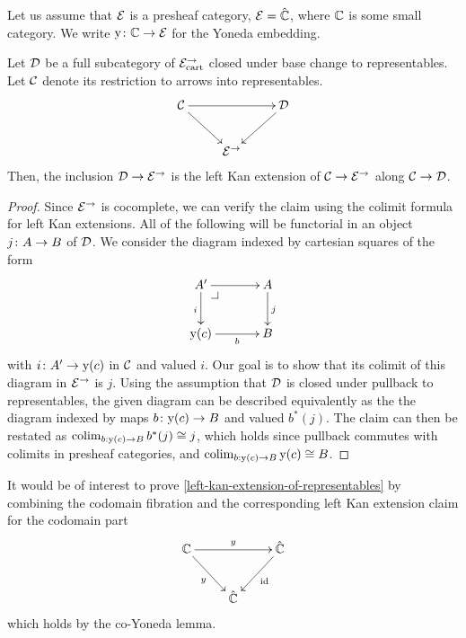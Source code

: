 \documentclass[reqno,10pt,a4paper,oneside]{amsart}
\begin{document}
\medskip

\newcommand{\yon}{\mathrm{y}} 
Let us assume that $\catE$ is a presheaf category, \ie $\catE = \hat{\cat{C}}$, where $\catC$ is some small category. We write $\yon \co \cat{C} \to \catE$ for the Yoneda embedding.

\begin{lemma}
\label{left-kan-extension-of-representables}
Let $\cal{D}$ be a full subcategory of $\catE_{\cart}^{\to}$ closed under base change to representables.
Let $\cal{C}$ denote its restriction to arrows into representables.
\[
\xymatrix{
  \cal{C}
  \ar[rr]
  \ar[dr]
&&
  \cal{D}
  \ar[dl]
\\&
  \catE^{\to}
}
\]
Then, the inclusion $\cal{D} \to \catE^{\to}$ is the left Kan extension of $\cal{C} \to \catE^{\to}$ along $\cal{C} \to \cal{D}$.
\end{lemma}



\begin{proof}
Since $\catE^{\to}$ is cocomplete, we can verify the claim using  the colimit formula for left Kan extensions.
All of the following will be functorial in an object $j \co A \to B$ of $\cal{D}$.
We consider the diagram indexed by cartesian squares of the form
\[
\xymatrix@C=1.2cm{
  A'
  \ar[r]
  \ar[d]_{i}
  \pullback{dr}
&
  A
  \ar[d]^{j}
\\
  \yon(c) 
  \ar[r]_-b 
&
  B
}
\]
with $i \co A' \to \yon(c)$ in $\cal{C}$ and valued $i$.
Our goal is to show that its colimit of this diagram in $\catE^{\to}$ is $j$.
Using the assumption that $\cal{D}$ is closed under pullback to representables, the given diagram
can be described equivalently as the the diagram indexed by maps $b \co \yon(c) \to B$ and valued $b^*(j)$. The claim can then be restated as  $\colim_{b : \yon(c) \to B} b^*(j) \iso j$, which 
holds since pullback commutes with colimits in presheaf categories, and  $\colim_{b : \yon(c) \to B} \yon(c) \iso B$.
\end{proof}


\begin{remark} It would be of interest to prove \cref{left-kan-extension-of-representables} by combining 
the codomain fibration and the corresponding left Kan extension claim for the codomain part
\[
\xymatrix{
  \cat{C}
  \ar[rr]^{y}
  \ar[dr]_{y}
&&
  \hat{\catC}
  \ar[dl]^{\id}
\\&
  \hat{\cat{C}}
}
\]
which holds by the co-Yoneda lemma.
\end{remark}
\end{document}

